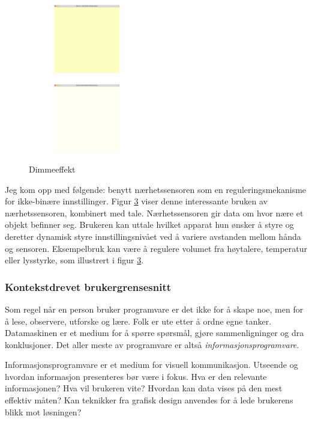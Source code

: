 \begin{figure}[h]
\begin{subfigure}{0.19\textwidth}
\includegraphics[width=3cm, height=3cm]{fig/light-4}
\caption{}
\label{fig:light-4}
\end{subfigure}
\begin{subfigure}{0.19\textwidth}
\includegraphics[width=3cm, height=3cm]{fig/light-5}
\caption{}
\label{fig:light-5}
\end{subfigure}
\caption{Dimmeeffekt}
\label{fig:light}
\end{figure}Jeg kom opp med følgende: benytt nærhetssensoren som en reguleringsmekanisme for ikke-binære innstillinger. Figur \ref{fig:light} viser denne interessante bruken av nærhetssensoren, kombinert med tale. Nærhetssensoren gir data om hvor nære et objekt befinner seg. Brukeren kan uttale hvilket apparat hun ønsker å styre og deretter dynamisk styre innstillingsnivået ved å variere avstanden mellom hånda og sensoren. Eksempelbruk kan være å regulere volumet fra høytalere, temperatur eller lysstyrke, som illustrert i figur \ref{fig:light}.\\

\subsubsection*{Kontekstdrevet brukergrensesnitt}
Som regel når en person bruker programvare er det ikke for å skape noe, men for å lese, observere, utforske og lære. Folk er ute etter å ordne egne tanker. Datamaskinen er et medium for å spørre spørsmål, gjøre sammenligninger og dra konklusjoner. Det aller meste av programvare er altså \emph{informasjonsprogramvare}. 

Informasjonsprogramvare er et medium for visuell kommunikasjon. Utseende og hvordan informasjon presenteres bør være i fokus. Hva er den relevante informasjonen? Hva vil brukeren vite? Hvordan kan data vises på den mest effektiv måten? Kan teknikker fra grafisk design anvendes for å lede brukerens blikk mot løsningen?

